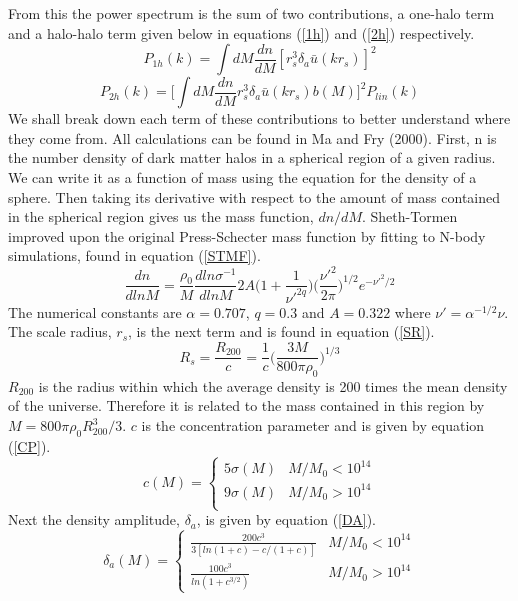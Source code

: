 \documentclass[12pt]{article}
\begin{document}
From this the power spectrum is the sum of two contributions, a one-halo term and a halo-halo term given below in equations (\ref{1h}) and (\ref{2h}) respectively.
\begin{equation} \label{1h}
P_{1h}(k) = \int dM \frac{dn}{dM} [r_{s}^3 \delta_a \bar{u} (kr_s)]^2
\end{equation}
\begin{equation} \label{2h}
P_{2h}(k) = \Big [ \int dM \frac{dn}{dM} r_{s}^3 \delta_a \bar{u} (kr_s) b(M) \Big ]^2 P_{lin}(k)
\end{equation}
We shall break down each term of these contributions to better understand where they come from. All calculations can be found in Ma and Fry (2000). First, n is the number density of dark matter halos in a spherical region of a given radius. We can write it as a function of mass using the equation for the density of a sphere. Then taking its derivative with respect to the amount of mass contained in the spherical region gives us the mass function, $dn/dM$. Sheth-Tormen improved upon the original Press-Schecter mass function by fitting to N-body simulations, found in equation (\ref{STMF}).
\begin{equation} \label{STMF}
\frac{dn}{dlnM} = \frac{\rho_{0}}{M} \frac{d ln \sigma^{-1}}{d ln M} 2A  \Big (1 + \frac{1}{\nu'^{2q}} \Big) \Big(\frac{\nu'^{2}}{2 \pi} \Big)^{1/2} e^{-\nu'^{2} / 2}
\end{equation}
The numerical constants are $\alpha = 0.707$, $q = 0.3$ and $A = 0.322$ where $\nu' = \alpha^{-1/2} \nu$. The scale radius, $r_s$, is the next term and is found in equation (\ref{SR}).
\begin{equation} \label{SR}
R_s = \frac{R_{200}}{c} = \frac{1}{c} \Big(\frac{3M}{800\pi\rho_0}\Big)^{1/3}
\end{equation}
$R_{200}$ is the radius within which the average density is 200 times the mean density of the universe. Therefore it is related to the mass contained in this region by $M = 800\pi\rho_{0}R_{200}^{3}/3$. $c$ is the concentration parameter and is given by equation (\ref{CP}).
\begin{equation} \label{CP}
	c(M) = 
	\begin{cases}
		5\sigma(M) & M/M_0 < 10^{14} \\
		9\sigma(M) & M/M_0 > 10^{14} \\
	\end{cases}
\end{equation}
Next the density amplitude, $\delta_a$, is given by equation (\ref{DA}).
\begin{equation} \label{DA}
	\delta_a(M) = 
	\begin{cases}
		\frac{200c^{3}}{3[ln(1+c) - c/(1+c)]} & M/M_0 < 10^{14} \\
		\frac{100c^{3}}{ln(1+c^{3/2})} & M/M_0 > 10^{14}
	\end{cases}
\end{equation}
\end{document}
